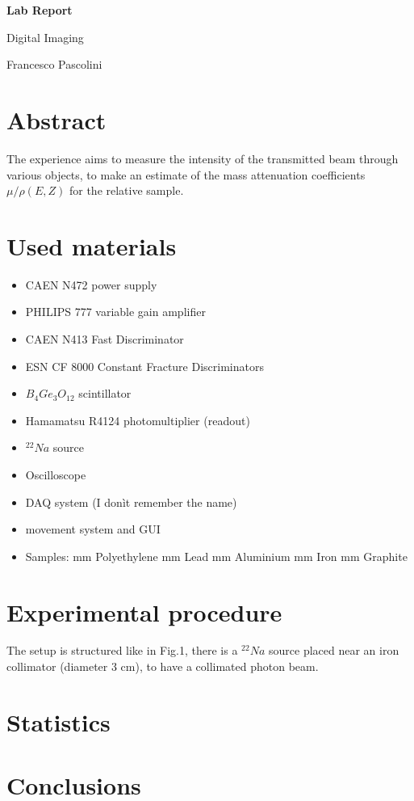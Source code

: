\documentclass{article}
\begin{document}
	\begin{center}
		\bfseries \Large Lab Report
	\end{center}
	\vspace{5mm}
	\begin{center}
		Digital Imaging
	\end{center}
	\vspace{130mm}
	\begin{flushright}
		Francesco Pascolini\\
	\end{flushright}
	\newpage
	
	\section{Abstract}
		The experience aims to measure the intensity of the transmitted beam through various objects, to make an estimate of the mass attenuation coefficients $\mu/\rho(E,Z)$ for the relative sample.
	\section{Used materials}
		\begin{itemize}
			\item CAEN N472 power supply
			\item PHILIPS 777 variable gain amplifier
			\item CAEN N413 Fast Discriminator 
			\item ESN CF 8000 Constant Fracture Discriminators
			\item $B_{4}Ge_{3}O_{12}$ scintillator
			\item Hamamatsu R4124 photomultiplier (readout)
			\item $^{22}Na$ source
			\item Oscilloscope
			\item DAQ system (I donìt remember the name)
			\item movement system and GUI
			\item Samples:
			 mm Polyethylene
			 mm Lead
			 mm Aluminium
			 mm Iron
			 mm Graphite
		\end{itemize}
	\section{Experimental procedure}
		The setup is structured like in Fig.1, there is a $^{22}Na$ source placed near an iron collimator (diameter 3 cm), to have a collimated photon beam.
	\section{Statistics}
	
	\section{Conclusions}
\end{document}
